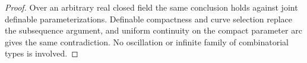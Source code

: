 \begin{proof}
Over an arbitrary real closed field the same conclusion holds against
joint definable parameterizations. Definable compactness and curve
selection replace the subsequence argument, and uniform continuity
on the compact parameter arc gives the same contradiction. No
oscillation or infinite family of combinatorial types is involved.
\end{proof}

